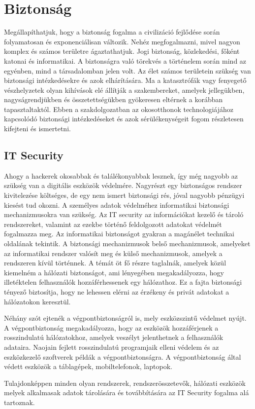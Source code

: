 \section{Biztonság}
Megállapíthatjuk, hogy a biztonság fogalma a civilizáció fejlődése során folyamatosan és exponenciálisan változik. Nehéz megfogalmazni, mivel nagyon komplex és számos területre ágaztathatjuk. Jogi biztonság, közlekedési, főként katonai és informatikai. A biztonságra való törekvés a történelem során mind az egyénben, mind a társadalomban jelen volt.
Az élet számos területein szükség van biztonsági intézkedésekre és azok elhárítására. Ma a katasztrófák vagy fenyegető vészhelyzetek olyan kihívások elé állítják a szakembereket, amelyek jellegükben, nagyságrendjükben és összetettségükben gyökeresen eltérnek a korábban tapasztaltaktól.\cite{kornyezetmernoki-tudastar} Ebben a szakdolgozatban az okosotthonok technologiájához kapcsolódó biztonsági intézkedéseket és azok sérülékenységeit fogom részletesen kifejteni és ismertetni.

\subsection{IT Security}
Ahogy a hackerek okosabbak és találékonyabbak lesznek, így még nagyobb az szükség van a digitális eszközök védelmére. Nagyrészt egy biztonságos rendszer kivitelezése költséges, de egy nem ismert biztonsági rés, jóval nagyobb pénzügyi kiesést tud okozni. A személyes adatok védelméhez informatikai biztonsági mechanizmusokra van szükség. Az IT security az információkat kezelő és tároló rendszereket, valamint az ezekbe történő feldolgozott adatokat védelmét fogalmazza meg. Az informatikai biztonságot gyakran a magánélet technikai oldalának tekintik. A biztonsági mechanizmusok belső mechanizmusok, amelyeket az informatikai rendszer valósít meg és külső mechanizmusok, amelyek a rendszeren kívül történnek. A témát öt fő részre taglalnák, amelyek közül kiemelném a hálózati biztonságot, ami lényegében megakadályozza, hogy illetéktelen felhasználók hozzáférhessenek egy hálózathoz. Ez a fajta biztonsági tényező biztosítja, hogy ne lehessen elérni az érzékeny és privát adatokat a hálózatokon keresztül.
\par Néhány szót ejtenék a végpontbiztonságról is, mely eszközszintű védelmet nyújt. A végpontbiztonság megakadályozza, hogy az eszközök hozzáférjenek a rosszindulatú hálózatokhoz, amelyek veszélyt jelenthetnek a felhasználók adataira. Naojain fejlett rosszindulatú programjaik elleni védelem és az eszközkezelő szoftverek példák a végpontbiztonságra. A végpontbiztonság által védett eszközök a táblagépek, mobiltelefonok, laptopok.
\par Tulajdonképpen minden olyan rendszerek, rendszerösszetevők, hálózati eszközök melyek alkalmasak adatok tárolására és továbbítására az IT Security fogalma alá tartoznak.\cite{cisco_2022}

